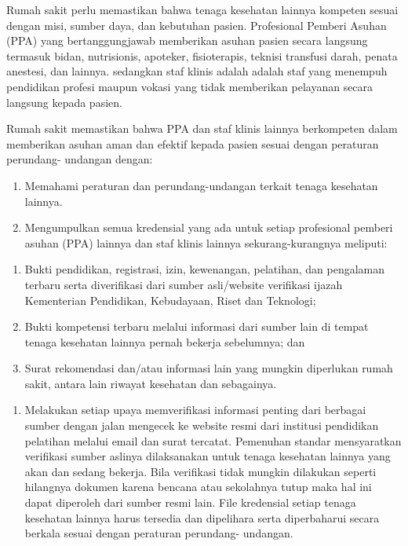 \documentclass[
]{book}
\providecommand{\tightlist}{%
  \setlength{\itemsep}{0pt}\setlength{\parskip}{0pt}}
\begin{document}
Rumah sakit perlu memastikan bahwa tenaga kesehatan lainnya kompeten sesuai dengan misi, sumber daya, dan kebutuhan pasien. Profesional Pemberi Asuhan (PPA) yang bertanggungjawab memberikan asuhan pasien secara langsung termasuk bidan, nutrisionis, apoteker, fisioterapis, teknisi transfusi darah, penata anestesi, dan lainnya. sedangkan staf klinis adalah adalah staf yang menempuh pendidikan profesi maupun vokasi yang tidak memberikan pelayanan secara langsung kepada pasien.

Rumah sakit memastikan bahwa PPA dan staf klinis lainnya berkompeten dalam memberikan asuhan aman dan efektif kepada pasien sesuai dengan peraturan perundang- undangan dengan:

\begin{enumerate}
\def\labelenumi{\alph{enumi}.}
\tightlist
\item
  Memahami peraturan dan perundang-undangan terkait tenaga kesehatan lainnya.
\item
  Mengumpulkan semua kredensial yang ada untuk setiap profesional pemberi asuhan (PPA) lainnya dan staf klinis lainnya sekurang-kurangnya meliputi:
\end{enumerate}

\begin{enumerate}
\def\labelenumi{\arabic{enumi}.}
\tightlist
\item
  Bukti pendidikan, registrasi, izin, kewenangan, pelatihan, dan pengalaman terbaru serta diverifikasi dari sumber asli/website verifikasi ijazah Kementerian Pendidikan, Kebudayaan, Riset dan Teknologi;
\item
  Bukti kompetensi terbaru melalui informasi dari sumber lain di tempat tenaga kesehatan lainnya pernah bekerja sebelumnya; dan
\item
  Surat rekomendasi dan/atau informasi lain yang mungkin diperlukan rumah sakit, antara lain riwayat kesehatan dan sebagainya.
\end{enumerate}

\begin{enumerate}
\def\labelenumi{\alph{enumi}.}
\setcounter{enumi}{2}
\tightlist
\item
  Melakukan setiap upaya memverifikasi informasi penting dari berbagai sumber dengan jalan mengecek ke website resmi dari institusi pendidikan pelatihan melalui email dan surat tercatat. Pemenuhan standar mensyaratkan verifikasi sumber aslinya dilaksanakan untuk tenaga kesehatan lainnya yang akan dan sedang bekerja. Bila verifikasi tidak mungkin dilakukan seperti hilangnya dokumen karena bencana atau sekolahnya tutup maka hal ini dapat diperoleh dari sumber resmi lain. File kredensial setiap tenaga kesehatan lainnya harus tersedia dan dipelihara serta diperbaharui secara berkala sesuai dengan peraturan perundang- undangan.
\end{enumerate}
\end{document}
